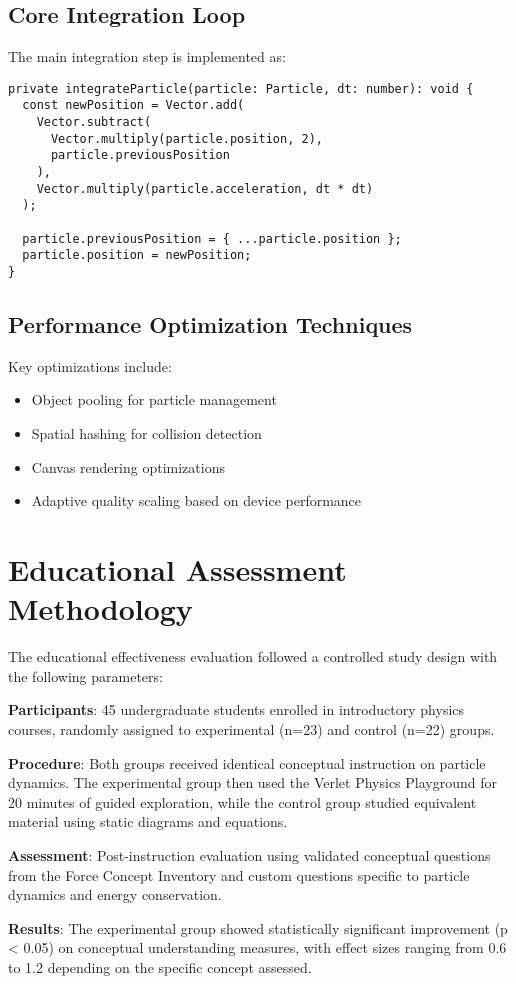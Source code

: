 \documentclass[12pt,journal,onecolumn]{IEEEtran}
\begin{document}
\subsection{Core Integration Loop}
The main integration step is implemented as:

\begin{verbatim}
private integrateParticle(particle: Particle, dt: number): void {
  const newPosition = Vector.add(
    Vector.subtract(
      Vector.multiply(particle.position, 2),
      particle.previousPosition
    ),
    Vector.multiply(particle.acceleration, dt * dt)
  );
  
  particle.previousPosition = { ...particle.position };
  particle.position = newPosition;
}
\end{verbatim}

\subsection{Performance Optimization Techniques}
Key optimizations include:

\begin{itemize}
\item Object pooling for particle management
\item Spatial hashing for collision detection
\item Canvas rendering optimizations
\item Adaptive quality scaling based on device performance
\end{itemize}

\section{Educational Assessment Methodology}
\label{app:assessment}

The educational effectiveness evaluation followed a controlled study design with the following parameters:

\textbf{Participants}: 45 undergraduate students enrolled in introductory physics courses, randomly assigned to experimental (n=23) and control (n=22) groups.

\textbf{Procedure}: Both groups received identical conceptual instruction on particle dynamics. The experimental group then used the Verlet Physics Playground for 20 minutes of guided exploration, while the control group studied equivalent material using static diagrams and equations.

\textbf{Assessment}: Post-instruction evaluation using validated conceptual questions from the Force Concept Inventory and custom questions specific to particle dynamics and energy conservation.

\textbf{Results}: The experimental group showed statistically significant improvement (p < 0.05) on conceptual understanding measures, with effect sizes ranging from 0.6 to 1.2 depending on the specific concept assessed.
\end{document}
